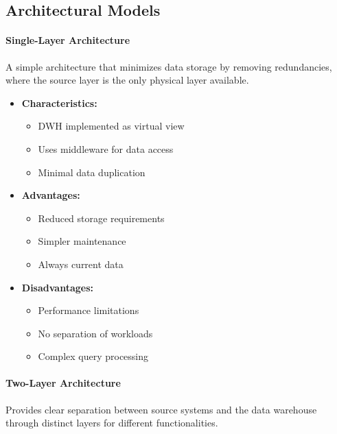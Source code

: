 \documentclass[a4paper,11pt]{article}
\newcommand{\definition}[1]{
  \begin{tcolorbox}[colback=blue!5,colframe=blue!40!black,title=Definition]
    #1
  \end{tcolorbox}
}
\begin{document}
\subsection{Architectural Models}

\paragraph{Single-Layer Architecture}
\definition{
A simple architecture that minimizes data storage by removing redundancies, where the source layer is the only physical layer available.
}

\begin{itemize}
    \item \textbf{Characteristics:}
        \begin{itemize}
            \item DWH implemented as virtual view
            \item Uses middleware for data access
            \item Minimal data duplication
        \end{itemize}
    \item \textbf{Advantages:}
        \begin{itemize}
            \item Reduced storage requirements
            \item Simpler maintenance
            \item Always current data
        \end{itemize}
    \item \textbf{Disadvantages:}
        \begin{itemize}
            \item Performance limitations
            \item No separation of workloads
            \item Complex query processing
        \end{itemize}
\end{itemize}

\paragraph{Two-Layer Architecture}
\definition{
Provides clear separation between source systems and the data warehouse through distinct layers for different functionalities.
}
\end{document}
